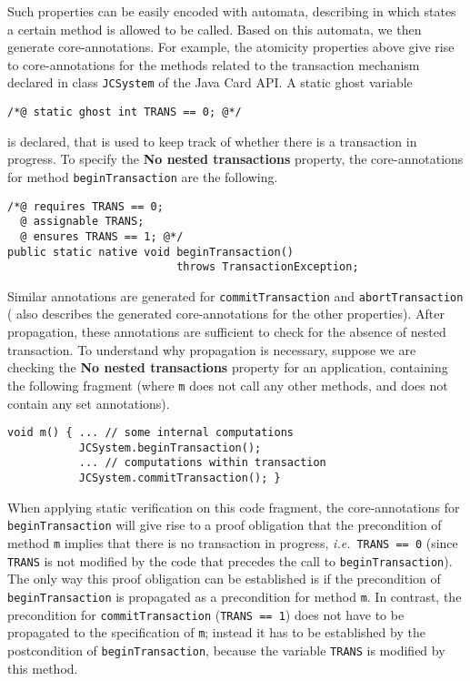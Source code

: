 Such properties can be easily encoded with automata, describing in
which states a certain method is allowed to be called. Based on this
automata, we then generate core-annotations. For example, the
atomicity properties above give rise to core-annotations for the
methods related to the transaction mechanism declared in class
\texttt{JCSystem} of the Java Card API. A static ghost variable 
\begin{verbatim}
/*@ static ghost int TRANS == 0; @*/
\end{verbatim}
is declared, that is used to keep track of whether there is a
transaction in progress.  To specify the \textbf{No nested
transactions} property, the core-annotations for method
\texttt{beginTransaction} are the following. 

\begin{verbatim}
/*@ requires TRANS == 0;
  @ assignable TRANS;
  @ ensures TRANS == 1; @*/
public static native void beginTransaction() 
                          throws TransactionException;
\end{verbatim}
Similar annotations are generated for \texttt{commitTransaction} and
\texttt{abort\-Trans\-action} (\cite{PavlovaBBHL04} also
describes the generated core-annotations for the other
properties). After propagation, these annotations are sufficient to
check for the absence of nested transaction.  To understand why
propagation is necessary, suppose we are checking the \textbf{No
nested transactions} property for an application, containing the
following fragment (where
\texttt{m} does not call any other methods, and does not contain any
set annotations).

\begin{verbatim}
void m() { ... // some internal computations
           JCSystem.beginTransaction();
           ... // computations within transaction
           JCSystem.commitTransaction(); }
\end{verbatim}

When applying static verification on this code fragment, the
core-annotations for \texttt{beginTransaction} will give rise to a
proof obligation that the precondition of method
\texttt{m} implies that there is no transaction in progress,
\emph{i.e.}\ \texttt{TRANS == 0} (since \texttt{TRANS} is not modified
by the code that precedes the call to \texttt{beginTransaction}). The
only way this proof obligation can be established is if the
precondition of \texttt{beginTransaction} is propagated as a
precondition for method \texttt{m}. In contrast, the precondition for
\texttt{commitTransaction} (\texttt{TRANS == 1}) does not have to be
propagated to the specification of \texttt{m}; instead it has to be
established by the postcondition of \texttt{begin\-Transaction},
because the variable \texttt{TRANS} is modified by this method.


